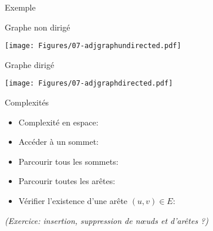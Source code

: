 \begin{frame}{Exemple}

Graphe non dirigé
\centerline{\texttt{[image: Figures/07-adjgraphundirected.pdf]}}

\bigskip

Graphe dirigé
\centerline{\texttt{[image: Figures/07-adjgraphdirected.pdf]}}

\end{frame}

\begin{frame}{Complexités}
\begin{itemize}
\item Complexité en espace: 
\item Accéder à un sommet: 
\item Parcourir tous les sommets: 
\item Parcourir toutes les arêtes: 
\item Vérifier l'existence d'une arête $(u,v)\in E$: 
\end{itemize}

{\it (Exercice: insertion, suppression de n\oe uds et d'arêtes ?)}

\end{frame}

